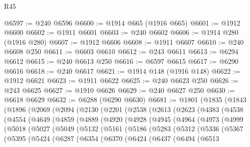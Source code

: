 \begin{lexlean}{R45}
\begin{coremodule}
{@6597 := @240 @6596
@6600 := @1914 @665 (@1916 @665)
@6601 := @1912 @6600
@6602 := @1911 @6601
@6603 := @240 @6602
@6606 := @1914 @280 (@1916 @280)
@6607 := @1912 @6606
@6608 := @1911 @6607
@6610 := @240 @6608 @250
@6611 := @6603 @6610
@6612 := @243 @6611
@6613 := @6294 @6612
@6615 := @240 @6613 @250
@6616 := @6597 @6615
@6617 := @6290 @6616
@6618 := @240 @6617
@6621 := @1914 @148 (@1916 @148)
@6622 := @1912 @6621
@6623 := @1911 @6622
@6625 := @240 @6623 @250
@6626 := @243 @6625
@6627 := @1910 @6626
@6629 := @240 @6627 @250
@6630 := @6618 @6629
@6632 := @6288 (@6290 @6630)
@6681 := @1801
    (@1835
      (@1843
        (@1896
          (@2069
            (@2094
              (@2130
                (@2201
                  (@2538
                    (@2613
                      (@2623
                        (@4383
                          (@4538
                            (@4554
                              (@4649
                                (@4859
                                  (@4889
                                    (@4920
                                      (@4928
                                        (@4945
                                          (@4964
                                            (@4973
                                              (@4999
                                                (@5018
                                                  (@5027
                                                    (@5049
                                                      (@5132
                                                        (@5161
                                                          (@5186
                                                            (@5283
                                                              (@5312
                                                                (@5336
                                                                  (@5367
                                                                    (@5395
                                                                      (@5424
                                                                        (@6287
                                                                          (@6354
                                                                            (@6370
                                                                              (@6424
                                                                                (@6437
                                                                                  (@6494
                                                                                    (@6513
}
\end{coremodule}
\end{lexlean}
